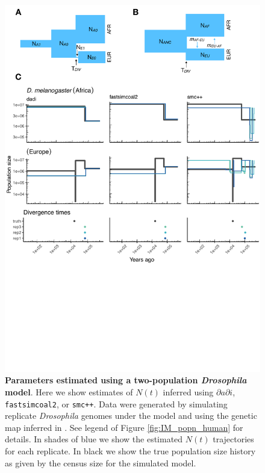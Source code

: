 \documentclass[12pt,halfline,a4paper]{ouparticle}
\newcommand{\dadi}{$\partial a \partial i$\xspace}
\newcommand{\smcpp}{\texttt{smc++}\xspace}
\newcommand{\fastsimcoal}{\texttt{fastsimcoal2}\xspace}
\begin{document}
\begin{figure}
\begin{center}
\includegraphics[width=0.8\linewidth]{display_items/d_mel_two_popn_comp.pdf}
\caption{\textbf{Parameters estimated using a two-population \emph{Drosophila} model}.
Here we show estimates of $N(t)$ inferred using \dadi, \fastsimcoal, or \smcpp.
Data were generated by simulating
replicate \emph{Drosophila} genomes under the \cite{li2006inferring} model and using the genetic map
inferred in \cite{comeron2012many}. See legend of Figure \ref{fig:IM_popn_human} for details.
In shades of blue we show the estimated
$N(t)$ trajectories for each replicate. In black we show the true population size history
as given by the census size for the simulated model.}
\label{fig:two_popn_fly}
\end{center}
\end{figure}
\end{document}
